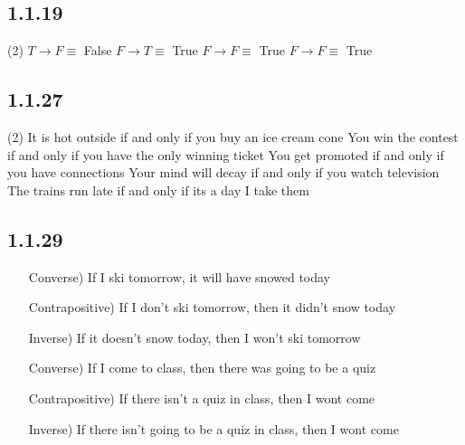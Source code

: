 \documentclass[12pt,titlepage]{extarticle}
\begin{document}
\subsection*{1.1.19}
\begin{tasks}(2)
    \task $T \rightarrow F \equiv$ False
    \task $F \rightarrow T \equiv$ True
    \task $F \rightarrow F \equiv$ True
    \task $F \rightarrow F \equiv$ True
\end{tasks}

\subsection*{1.1.27}
\begin{tasks}(2)
    \task It is hot outside if and only if you buy an ice cream cone
    \task You win the contest if and only if you have the only winning ticket
    \task You get promoted if and only if you have connections
    \task Your mind will decay if and only if you watch television
    \task The trains run late if and only if its a day I take them
\end{tasks}

\subsection*{1.1.29}

\begin{problem}
    \begin{enumerate}[leftmargin=3.0cm]
        \item[Converse)] If I ski tomorrow, it will have snowed today
        \item[Contrapositive)] If I don't ski tomorrow, then it didn't snow today
        \item[Inverse)] If it doesn't snow today, then I won't ski tomorrow
    \end{enumerate}
\end{problem}

\begin{problem}
    \begin{enumerate}[leftmargin=3cm]
        \item[Converse)] If I come to class, then there was going to be a quiz
        \item[Contrapositive)] If there isn't a quiz in class, then I wont come
        \item[Inverse)] If there isn't going to be a quiz in class, then I wont come
    \end{enumerate}
\end{problem}
\end{document}
